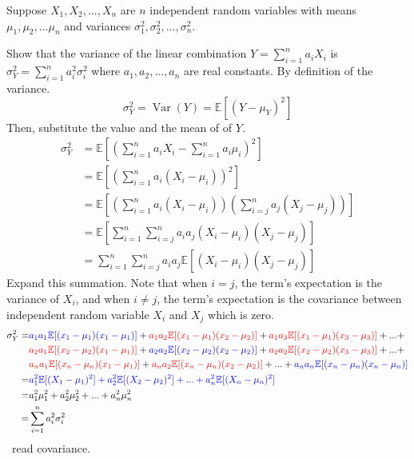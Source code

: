 \documentclass[11pt,a4paper,fleqn]{article}
\numberwithin{equation}{section}
\DeclareMathOperator\Var{\mathrm{Var}}
\newcommand{\TODO}{\textcolor{ErrorRed}{\fbox{TODO}}\ }
\begin{document}
\begin{exec}
    Suppose $X_1,X_2,...,X_n$ are $n$ independent random variables with means $\mu_1,\mu_2,...\mu_n$ and variances $\sigma_1^2,\sigma_2^2,...,\sigma_n^2$.
    
    Show that the variance of the linear combination $Y=\sum_{i=1}^{n}a_iX_i$ is $\sigma_Y^2=\sum_{i=1}^{n}a_i^2\sigma_i^2$ where $a_1,a_2,...,a_n$ are real constants.
    \tcblower
    By definition of the variance.
    \begin{equation*}
        \sigma_Y^2=\Var(Y)=\mathbb{E}[(Y-\mu_Y)^2]
    \end{equation*}
    Then, substitute the value and the mean of of $Y$.
    \begin{align*}
        \sigma_Y^2
        &=\mathbb{E}\left[\left(\sum_{i=1}^{n}a_iX_i-\sum_{i=1}^{n}a_i\mu_i\right)^2\right]\\
        &=\mathbb{E}\left[\left(\sum_{i=1}^{n}a_i(X_i-\mu_i)\right)^2\right]\\
        &=\mathbb{E}\left[\left(\sum_{i=1}^{n}a_i(X_i-\mu_i)\right) \left(\sum_{i=j}^{n}a_j(X_j-\mu_j)\right)\right]\\
        &=\mathbb{E}\left[\sum_{i=1}^{n}\sum_{i=j}^{n}a_ia_j(X_i-\mu_i)(X_j-\mu_j) \right]\\
        &=\sum_{i=1}^{n}\sum_{i=j}^{n}a_ia_j\mathbb{E}\left[(X_i-\mu_i)(X_j-\mu_j) \right]
    \end{align*}
    Expand this summation. Note that when $i=j$, the term's expectation is the variance of $X_i$, and when $i\neq j$, the term's expectation is the covariance between independent random variable $X_i$ and $X_j$ which is zero.
    \begin{align*}
        \sigma_Y^2
        =&\mathcolor{blue}{a_1a_1\mathbb{E}[(x_1-\mu_1)(x_1-\mu_1)]}+
        \mathcolor{red}{a_1a_2\mathbb{E}[(x_1-\mu_1)(x_2-\mu_2)]}+
        \mathcolor{red}{a_1a_3\mathbb{E}[(x_1-\mu_1)(x_3-\mu_3)]}+ ... +\\
        &\mathcolor{red}{a_2a_1\mathbb{E}[(x_2-\mu_2)(x_1-\mu_1)]}+
        \mathcolor{blue}{a_2a_2\mathbb{E}[(x_2-\mu_2)(x_2-\mu_2)]}+
        \mathcolor{red}{a_2a_2\mathbb{E}[(x_2-\mu_2)(x_3-\mu_3)]}+ ... +\\
        &\mathcolor{red}{a_na_1\mathbb{E}[(x_n-\mu_n)(x_1-\mu_1)]}+
        \mathcolor{red}{a_na_2\mathbb{E}[(x_n-\mu_n)(x_2-\mu_2)]}+...+
        \mathcolor{blue}{a_na_n\mathbb{E}[(x_n-\mu_n)(x_n-\mu_n)]}\\
        =&\mathcolor{blue}{a_1^2\mathbb{E}[(X_1-\mu_1)^2]+a_2^2\mathbb{E}[(X_2-\mu_2)^2]+...+a_n^2\mathbb{E}[(X_n-\mu_n)^2]}\\
        =&a_1^2\mu_1^2+a_2^2\mu_2^2+...+a_n^2\mu_n^2\\
        =&\sum_{i=1}^{n}a_i^2\sigma_i^2
    \end{align*}
    \TODO read covariance.
\end{exec}
\end{document}
